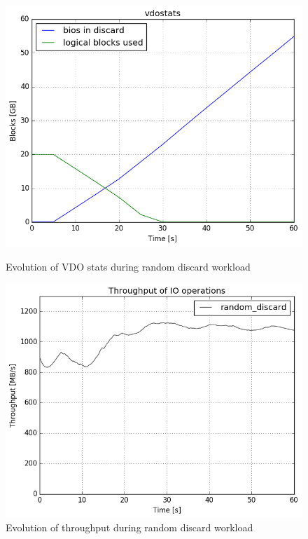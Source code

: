 \documentclass[
  color, %
  table, %
  lof,   %
  lot,   %
]{fithesis3}
\begin{document}
\begin{figure}[!htb]
        \centering
        \includegraphics[width=\textwidth]{../results/discards/full_VDO/report/tar_184_vdostats}
\caption[Evolution of VDO stats during random discard workload]{Evolution of VDO stats during random discard workload}
\label{fig:discard-full-vdostats}
        \centering
        \includegraphics[width=\textwidth]{../results/discards/full_VDO/report/tar_184_bw.png}
\caption[Evolution of throughput during random discard workload]{Evolution of throughput during random discard workload}
\label{fig:discard-full-througput}
\end{figure}
\end{document}
